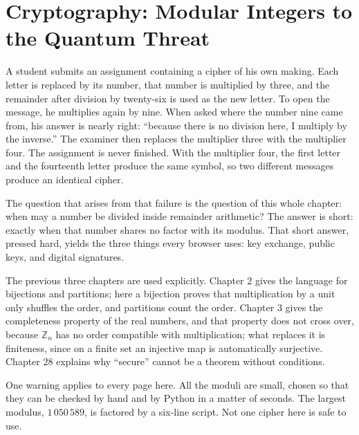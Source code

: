 \chapter[Cryptography: Modular to Quantum]{Cryptography: Modular Integers to the Quantum Threat}

A student submits an assignment containing a cipher of his own making. Each letter is replaced by
its number, that number is multiplied by three, and the remainder after division by twenty-six is
used as the new letter. To open the message, he multiplies again by nine. When asked where the
number nine came from, his answer is nearly right: ``because there is no division here, I multiply
by the inverse.'' The examiner then replaces the multiplier three with the multiplier four. The
assignment is never finished. With the multiplier four, the first letter and the fourteenth letter
produce the same symbol, so two different messages produce an identical cipher.

The question that arises from that failure is the question of this whole chapter: when may a number
be divided inside remainder arithmetic? The answer is short: exactly when that number shares no
factor with its modulus. That short answer, pressed hard, yields the three things every browser
uses: key exchange, public keys, and digital signatures.

The previous three chapters are used explicitly. Chapter 2 gives the language for bijections and
partitions; here a bijection proves that multiplication by a unit only shuffles the order, and
partitions count the order. Chapter 3 gives the completeness property of the real numbers, and that
property does not cross over, because $\mathbb{Z}_n$ has no order compatible with multiplication;
what replaces it is finiteness, since on a finite set an injective map is automatically surjective.
Chapter 28 explains why ``secure'' cannot be a theorem without conditions.

One warning applies to every page here. All the moduli are small, chosen so that they can be checked
by hand and by Python in a matter of seconds. The largest modulus, $1\,050\,589$, is factored by a
six-line script. Not one cipher here is safe to use.

